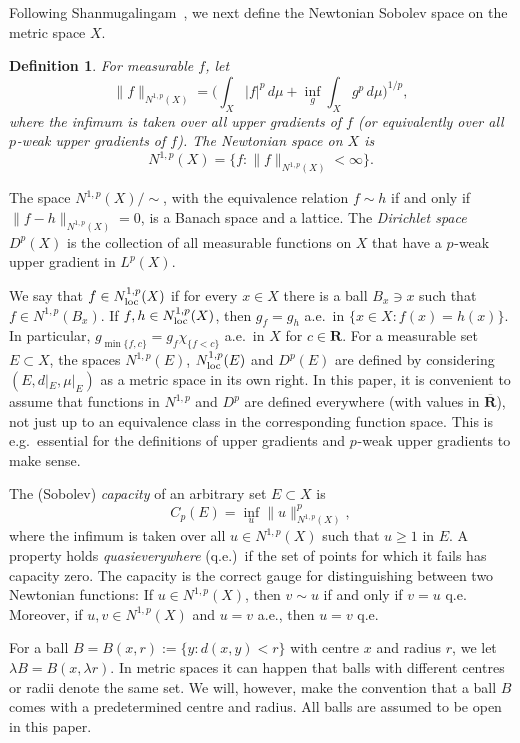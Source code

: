 \documentclass[a4paper,twoside]{article}
\theoremstyle{propositional}
\theoremstyle{descriptive}
\newtheorem{deff}[thm]{Definition}
\theoremstyle{remarkstyle}
\newcommand{\Cp}{{C_p}}
\newcommand{\loc}{_{\rm loc}}
\newcommand{\p}{{$p\mspace{1mu}$}}
\newcommand{\R}{\mathbf{R}}
\newcommand{\eR}{{\overline{\R}}}
\newcommand{\Np}{N^{1,p}}
\newcommand{\Dp}{D^{p}}
\newcommand{\Nploc}{N^{1,p}\loc}
\numberwithin{equation}{section}
\begin{document}
Following Shan\-mu\-ga\-lin\-gam~\cite{Sh-rev}, 
we next define the Newtonian Sobolev space on the metric space $X$.

\begin{deff} \label{deff-Np}
For measurable $f$, let
\[
        \|f\|_{\Np(X)} = \biggl( \int_X |f|^p \, d\mu
                + \inf_g  \int_X g^p \, d\mu \biggr)^{1/p},
\]
where the infimum is taken over all upper gradients of $f$
(or equivalently over all \p-weak upper gradients of $f$).
The \emph{Newtonian space} on $X$ is
\[
        \Np (X) = \{f: \|f\|_{\Np(X)} <\infty \}.
\]
\end{deff}

The space $\Np(X)/{\sim}$, 
with the equivalence relation
$f \sim h$ if and only if $\|f-h\|_{\Np(X)}=0$,
is a Banach space and a lattice.
The \emph{Dirichlet space} $\Dp(X)$ is the collection of all
measurable functions on $X$ 
that have a \p-weak upper gradient in $L^p(X)$.


We say  that $f \in \Nploc(X)$ if
for every $x \in X$ there is a ball $B_x\ni x$ such that
$f \in \Np(B_x)$. 
If $f,h \in \Nploc(X)$,
then $g_f=g_h$ a.e.\ in $\{x \in X : f(x)=h(x)\}$.
In particular, $g_{\min\{f,c\}}=g_f \chi_{\{f < c\}}$ a.e.\ in $X$
for $c \in \R$.
For a measurable set $E\subset X$, the spaces 
$\Np(E)$, $\Nploc(E)$ and $\Dp(E)$
are defined by
considering $(E,d|_E,\mu|_E)$ as a metric space in its own right.
In this paper, it is convenient to
assume that functions in $\Np$ and $\Dp$
 are defined everywhere (with values in $\eR$),
not just up to an equivalence class in the corresponding function space.
This is e.g.\ essential for the definitions of
upper gradients and \p-weak upper gradients to make sense.




The (Sobolev) \emph{capacity} of an arbitrary set $E\subset X$ is 
\[
\Cp(E) = \inf_u\|u\|_{\Np(X)}^p,
\]
where the infimum is taken over all $u \in \Np(X)$ such that
$u\geq 1$ in $E$.
A property holds \emph{quasieverywhere} (q.e.)\
if the set of points  for which it fails
has capacity zero.
The capacity is the correct gauge
for distinguishing between two Newtonian functions:
If $u \in \Np(X)$, then 
$v \sim u$ if and only if $v=u$ q.e.
Moreover, if $u,v \in \Np(X)$ and $u= v$ a.e., then $u=v$ q.e.


For a ball $B=B(x,r):=\{y : d(x,y)<r\}$ with centre $x$ and radius $r$, we let
$\lambda B = B(x, \lambda r)$. In metric spaces
it can happen that balls with different centres or
radii denote the same set.
We will, however,
make the convention that a ball $B$ comes with a predetermined
centre and radius.
All balls are assumed to be open in this paper.
\end{document}
